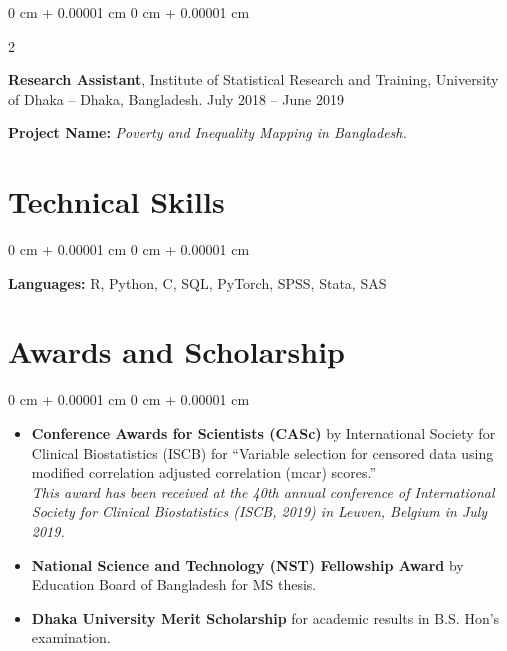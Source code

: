 \documentclass[10pt, letterpaper]{article}
\newenvironment{highlights}{
    \begin{itemize}[
        topsep=0.10 cm,
        parsep=0.10 cm,
        partopsep=0pt,
        itemsep=0pt,
        leftmargin=0 cm + 10pt
    ]
}{
    \end{itemize}
} %
\newenvironment{onecolentry}{
    \begin{adjustwidth}{
        0 cm + 0.00001 cm
    }{
        0 cm + 0.00001 cm
    }
}{
    \end{adjustwidth}
} %
\newenvironment{twocolentry}[2][]{
    \onecolentry
    \def\secondColumn{#2}
    \setcolumnwidth{\fill, 4.5 cm}
    \begin{paracol}{2}
}{
    \switchcolumn \raggedleft \secondColumn
    \end{paracol}
    \endonecolentry
} %
\begin{document}
    \begin{twocolentry}{
            July 2018 -- June 2019
        }
            \textbf{Research Assistant}, Institute of Statistical Research and Training, University of Dhaka -- Dhaka, Bangladesh.\end{twocolentry} 
            \textbf{Project Name:}
    \textit{Poverty and Inequality Mapping in Bangladesh.}\\
       

    \section{Technical Skills} 
        \begin{onecolentry}
            \textbf{Languages:} R, Python, C, SQL, PyTorch, SPSS, Stata, SAS
        \end{onecolentry}

        \vspace{0.2 cm}
    \section{Awards and Scholarship}
        \vspace{0.10 cm}
        \begin{onecolentry}
            \begin{highlights}
                \item \textbf{Conference Awards for Scientists (CASc)} by International Society for Clinical Biostatistics (ISCB) for “Variable selection for censored data using modified correlation adjusted correlation (mcar) scores.” \\
                \textit{This award has been received at the 40th annual conference of International Society for Clinical Biostatistics (ISCB, 2019) in Leuven, Belgium in July 2019.}
                \item \textbf{National Science and Technology (NST) Fellowship Award} by Education Board of Bangladesh for MS thesis.
                \item \textbf{Dhaka University Merit Scholarship} for academic results in B.S. Hon’s examination.
            \end{highlights}
        \end{onecolentry}
\end{document}

